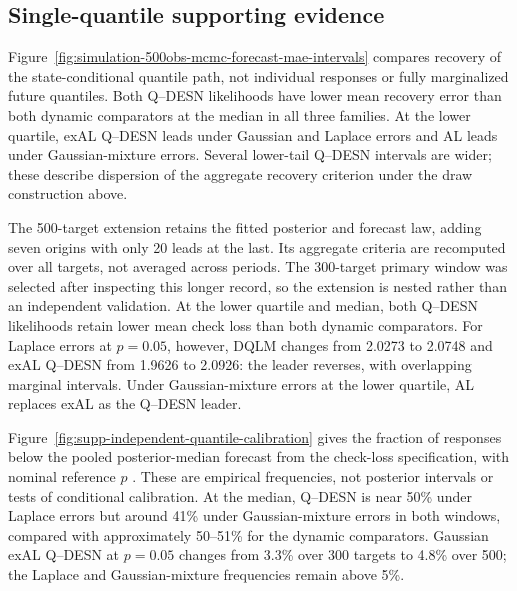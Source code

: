 \documentclass[12pt,letterpaper]{article}
\numberwithin{suppalgorithm}{section}
\numberwithin{equation}{section}
\numberwithin{table}{section}
\numberwithin{figure}{section}
\begin{document}
\subsection{Single-quantile supporting evidence}
\label{subsec:supp-independent-forecast-recovery}
\label{subsec:supp-independent-evaluation-sensitivity}
\label{subsec:supp-independent-calibration}

Figure~\ref{fig:simulation-500obs-mcmc-forecast-mae-intervals} compares
recovery of the state-conditional quantile path, not individual responses
or fully marginalized future quantiles. Both Q--DESN likelihoods have
lower mean recovery error than both dynamic comparators at the median in
all three families. At the lower quartile, exAL Q--DESN leads under
Gaussian and Laplace errors and AL leads under Gaussian-mixture errors.
Several lower-tail Q--DESN intervals are wider; these describe dispersion
of the aggregate recovery criterion under the draw construction above.



The 500-target extension retains the fitted posterior and forecast law,
adding seven origins with only 20 leads at the last. Its aggregate
criteria are recomputed over all targets, not averaged across periods.
The 300-target primary window was selected after inspecting this longer
record, so the extension is nested rather than an independent validation.
At the lower quartile and median, both Q--DESN likelihoods retain lower
mean check loss than both dynamic comparators. For Laplace errors at
\(p=0.05\), however, DQLM changes from 2.0273 to 2.0748 and exAL
Q--DESN from 1.9626 to 2.0926: the leader reverses, with overlapping
marginal intervals. Under Gaussian-mixture errors at the lower quartile,
AL replaces exAL as the Q--DESN leader.

Figure~\ref{fig:supp-independent-quantile-calibration} gives the fraction
of responses below the pooled posterior-median forecast from the
check-loss specification, with nominal reference \(p\)
\citep{GneitingResin2023Calibration}. These are empirical frequencies,
not posterior intervals or tests of conditional calibration.
At the median, Q--DESN is near 50\% under Laplace errors but around
41\% under Gaussian-mixture errors in both windows, compared with
approximately 50--51\% for the dynamic comparators. Gaussian exAL
Q--DESN at \(p=0.05\) changes from 3.3\% over 300 targets to 4.8\%
over 500; the Laplace and Gaussian-mixture frequencies remain above 5\%.
\end{document}
